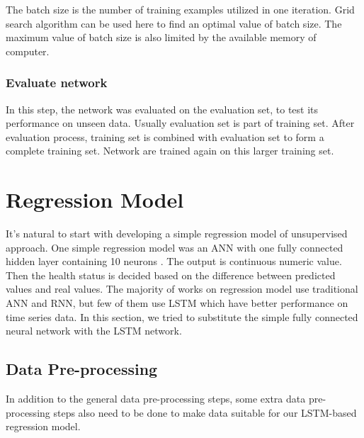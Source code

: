 The batch size is the number of training examples utilized in one iteration. Grid search algorithm can be used here to find an optimal value of batch size. The maximum value of batch size is also limited by the available memory of computer.

\subsubsection{Evaluate network}
In this step, the network was evaluated on the evaluation set, to test its performance on unseen data. Usually evaluation set is part of training set. After evaluation process, training set is combined with evaluation set to form a complete training set. Network are trained again on this larger training set.

\section{Regression Model}
It's natural to start with developing a simple regression model of unsupervised approach. One simple regression model was an ANN with one fully connected hidden layer containing 10 neurons \cite{Sofia}. The output is continuous numeric value. Then the health status is decided based on the difference between predicted values and real values. The majority of works on regression model use traditional ANN and RNN, but few of them use LSTM which have better performance on time series data. In this section, we tried to substitute the simple fully connected neural network with the LSTM network.

\subsection{Data Pre-processing}
In addition to the general data pre-processing steps, some extra data pre-processing steps also need to be done to make data suitable for our LSTM-based regression model. 

